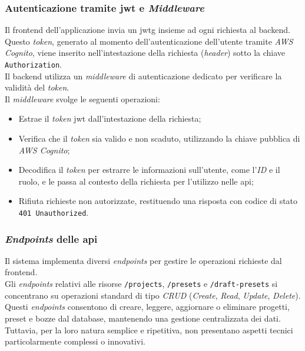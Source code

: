 \pagebreak

\subsubsection{Autenticazione tramite \gls{jwt} e \textit{Middleware}}

Il \gls{frontend} dell'applicazione invia un \gls{jwtg} insieme ad ogni richiesta al \gls{backend}.\\
Questo \textit{token}, generato al momento dell'autenticazione dell'utente tramite \textit{AWS Cognito}, viene inserito nell'intestazione della richiesta (\textit{header}) sotto la chiave \texttt{Authorization}.\\
Il \gls{backend} utilizza un \textit{middleware} di autenticazione dedicato per verificare la validità del \textit{token}.\\ 

\noindent Il \textit{middleware} svolge le seguenti operazioni:
\begin{itemize}
    \item Estrae il \textit{token} \gls{jwt} dall'intestazione della richiesta;
    \item Verifica che il \textit{token} sia valido e non scaduto, utilizzando la chiave pubblica di \textit{AWS Cognito};
    \item Decodifica il \textit{token} per estrarre le informazioni sull'utente, come l'\textit{ID} e il ruolo, e le passa al contesto della richiesta per l'utilizzo nelle \gls{api};
    \item Rifiuta richieste non autorizzate, restituendo una risposta con codice di stato \texttt{401 Unauthorized}.
\end{itemize}

\subsubsection{\textit{Endpoints} delle \gls{api}}

Il sistema implementa diversi \textit{endpoints} per gestire le operazioni richieste dal \gls{frontend}.\\
Gli \textit{endpoints} relativi alle risorse \texttt{/projects}, \texttt{/presets} e \texttt{/draft-presets} si concentrano su operazioni standard di tipo \textit{CRUD} (\textit{Create}, \textit{Read}, \textit{Update}, \textit{Delete}).\\
Questi \textit{endpoints} consentono di creare, leggere, aggiornare o eliminare progetti, preset e bozze dal database, mantenendo una gestione centralizzata dei dati. Tuttavia, per la loro natura semplice e ripetitiva, non presentano aspetti tecnici particolarmente complessi o innovativi.\\

